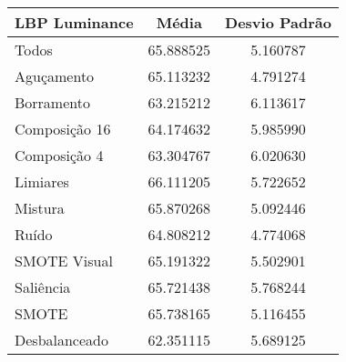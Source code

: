 

\begin{table}[!htbp]
\centering
\caption{}
\label{tab:resultados:x:melhor}
\begin{tabular}{|l|c|c|}
\hline
\textbf{LBP Luminance} & \textbf{Média}     & \textbf{Desvio Padrão} \\ \hline
   Todos        &  65.888525 &  5.160787  \\ \hline
  Aguçamento    &  65.113232 &  4.791274  \\ \hline
  Borramento    &  63.215212 &  6.113617  \\ \hline
  Composição 16 &  64.174632 &  5.985990  \\ \hline
  Composição 4  &  63.304767 &  6.020630  \\ \hline
  Limiares      &  66.111205 &  5.722652  \\ \hline
  Mistura       &  65.870268 &  5.092446  \\ \hline
  Ruído         &  64.808212 &  4.774068  \\ \hline
  SMOTE Visual  &  65.191322 &  5.502901  \\ \hline
  Saliência     &  65.721438 &  5.768244  \\ \hline
 SMOTE          &  65.738165 &  5.116455  \\ \hline
Desbalanceado   &  62.351115 &  5.689125  \\ \hline
\end{tabular}
\end{table}


